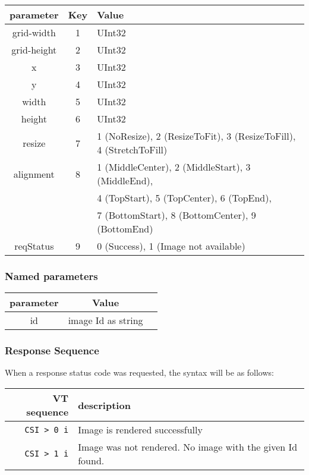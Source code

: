 \documentclass{article}
\newcommand{\code}[1]{\colorbox{light-gray}{\texttt{#1}}}
\begin{document}
\begin{tabular}{ |c|c|l| }
    \hline
    \textbf{parameter}   & \textbf{Key} & \textbf{Value} \\
    \hline
    grid-width  & 1   & UInt32 \\
    grid-height & 2   & UInt32 \\
    x           & 3   & UInt32 \\
    y           & 4   & UInt32 \\
    width       & 5   & UInt32 \\
    height      & 6   & UInt32 \\
    resize      & 7   & 1 (NoResize), 2 (ResizeToFit), 3 (ResizeToFill), 4 (StretchToFill) \\
    alignment   & 8   & 1 (MiddleCenter), 2 (MiddleStart), 3 (MiddleEnd), \\
                &     & 4 (TopStart), 5 (TopCenter), 6 (TopEnd), \\
                &     & 7 (BottomStart), 8 (BottomCenter), 9 (BottomEnd) \\
    reqStatus   & 9   & 0 (Success), 1 (Image not available) \\
    \hline
\end{tabular}

\subsubsection*{Named parameters}

\begin{tabular}{ |c|c|l| }
    \hline
    \textbf{parameter}   & \textbf{Value} \\
    \hline
    id          & image Id as string \\
    \hline
\end{tabular}

\subsubsection*{Response Sequence}

When a response status code was requested, the syntax will be as follows:

\begin{tabular}{ |r|l| }
    \hline
    \textbf{VT sequence} & \textbf{description} \\
    \hline
    \code{CSI > 0 i} & Image is rendered successfully \\
    \code{CSI > 1 i} & Image was not rendered. No image with the given Id found. \\
    \hline
\end{tabular}
\end{document}
